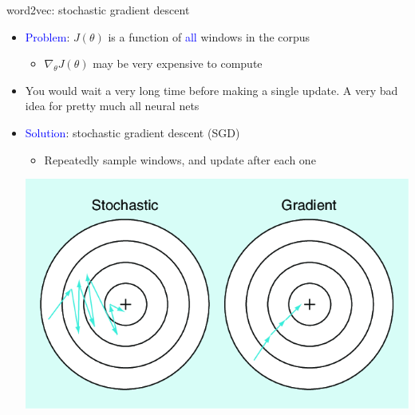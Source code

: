 \documentclass[usenames,dvipsnames,english]{beamer}
\begin{document}
\begin{frame}{word2vec: stochastic gradient descent}
    \begin{itemize}
        \setlength{\itemsep}{1em}
        \item \textcolor{blue}{Problem}: $J(\theta)$ is a function of \textcolor{blue}{all} windows in the corpus
        \begin{itemize}
        \vspace{5pt}
            \item $\nabla_{\theta}J(\theta)$ may be very expensive to compute
        \end{itemize}
        \item You would wait a very long time before making a single update. A very bad idea for pretty much all neural nets
        \item \textcolor{blue}{Solution}: stochastic gradient descent (SGD)
        \begin{itemize}
        \vspace{5pt}
            \item Repeatedly sample windows, and update after each one
        \end{itemize}
                \begin{center}
        \vspace{5pt}
    \includegraphics[scale=0.25]{Images/we_SGD.png}
    \end{center}
    \end{itemize}
    
\end{frame}
\end{document}
